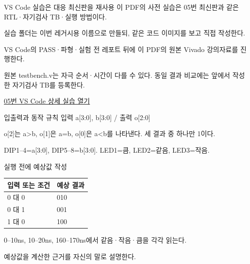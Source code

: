 \begin{frame}{VS Code 실습은 대응 최신판을 재사용}\relax
\small
이 PDF의 사전 실습은 05번 최신판과 같은 RTL·자기검사 TB·실행 방법이다.\par\vspace{0.22cm}실습 폴더는 이번 레거시용 이름으로 만들되, 같은 코드 이미지를 보고 직접 작성한다.\par\vspace{0.22cm}VS Code의 PASS·파형·실험 전 레포트 뒤에 이 PDF의 원본 Vivado 강의자료를 진행한다.\par\vspace{0.22cm}원본 testbench.v는 자극 순서·시간이 다를 수 있다. 동일 결과 비교에는 앞에서 작성한 자기검사 TB를 등록한다.\par\href{04.LAB1_05_COMPARATOR4_VIVADO.pdf}{05번 VS Code 상세 실습 열기}
\end{frame}

\begin{frame}[label=legacy-05-sim]{입출력과 동작 규칙}\relax
\small
입력 a[3:0], b[3:0] / 출력 o[2:0]\par\vspace{0.22cm}o[2]는 a>b, o[1]은 a=b, o[0]은 a<b를 나타낸다. 세 결과 중 하나만 1이다.\par\vspace{0.22cm}DIP1–4=a[3:0], DIP5–8=b[3:0]. LED1=큼, LED2=같음, LED3=작음.\par
\end{frame}

\begin{frame}{실행 전에 예상값 작성}\relax
\small
\begin{center}\renewcommand{\arraystretch}{1.45}
\begin{tabular}{l|l}
입력 또는 조건 & 예상 결과\\\hline
0 대 0 & 010\\
0 대 1 & 001\\
1 대 0 & 100\\
\end{tabular}\end{center}
0–10ns, 10–20ns, 160–170ns에서 같음·작음·큼을 각각 읽는다.\par\vspace{0.22cm}예상값을 계산한 근거를 자신의 말로 설명한다.\par
\end{frame}

